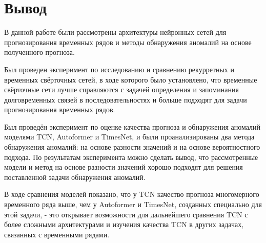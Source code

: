 \documentclass{article}
\begin{document}
\section{Вывод}
В данной работе были рассмотрены архитектуры нейронных сетей для прогнозирования временных рядов и методы обнаружения аномалий на основе полученного прогноза. 

Был проведен эксперимент по исследованию и сравнению рекурретных и временных свёрточных сетей, в ходе которого было установлено, что временные свёрточные сети лучше справляются с задачей определения и запоминания долговременных связей в последовательностях и больше подходят для задачи прогнозирования временных рядов. 

Был проведён эксперимент по оценке качества прогноза и обнаружения аномалий моделями TCN, Autoformer и TimesNet, и были проанализированы два метода обнаружения аномалий: на основе разности значений и на основе вероятностного подхода. По результатам эксперимента можно сделать вывод, что рассмотренные модели и метод на основе разности значений хорошо подходят для решения поставленной задачи обнаружения аномалий.

В ходе сравнения моделей показано, что у TCN качество прогноза многомерного временного ряда выше, чем у Autoformer и TimesNet, созданных специально для этой задачи, - это открывает возможности для дальнейшего сравнения TCN с более сложными архитектурами и изучения качества TCN в других задачах, связанных с временными рядами.



\end{document}
